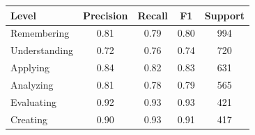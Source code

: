 \begin{tabular}{lcccc}
\hline
Level & Precision & Recall & F1 & Support \\
\hline
Remembering & 0.81 & 0.79 & 0.80 & 994 \\
Understanding & 0.72 & 0.76 & 0.74 & 720 \\
Applying & 0.84 & 0.82 & 0.83 & 631 \\
Analyzing & 0.81 & 0.78 & 0.79 & 565 \\
Evaluating & 0.92 & 0.93 & 0.93 & 421 \\
Creating & 0.90 & 0.93 & 0.91 & 417 \\
\hline
\end{tabular}